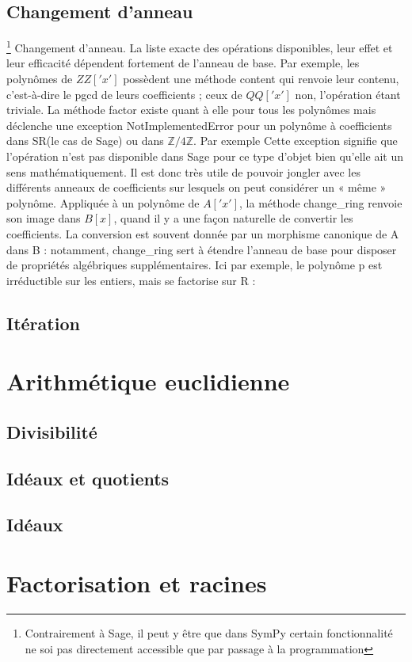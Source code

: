   \subsection{Changement d’anneau}\footnote{Contrairement à Sage, il peut y être que dans SymPy certain 
  fonctionnalité ne soi pas directement accessible que par passage à la programmation }
Changement d’anneau. La liste exacte des opérations disponibles, leur effet
et leur efficacité dépendent fortement de l’anneau de base. Par exemple, les
polynômes de $ZZ\left['x'\right]$ possèdent une méthode content qui renvoie leur contenu,
c’est-à-dire le pgcd de leurs coefficients ; ceux de $QQ\left['x'\right]$ non, l’opération étant
triviale. La méthode factor existe quant à elle pour tous les polynômes mais
déclenche une exception NotImplementedError pour un polynôme à coefficients
dans SR(le cas de Sage) ou dans $\mathbb{Z}/4\mathbb{Z}$. Par exemple Cette exception signifie que l’opération n’est pas disponible dans Sage pour ce type d’objet bien qu’elle ait un sens mathématiquement.
Il est donc très utile de pouvoir jongler avec les différents anneaux de coefficients
sur lesquels on peut considérer un « même » polynôme. Appliquée à un polynôme
de $A\left['x'\right]$, la méthode change\_ring renvoie son image dans $B\left[x\right]$, quand il y a une
façon naturelle de convertir les coefficients. La conversion est souvent donnée par
un morphisme canonique de A dans B : notamment, change\_ring sert à étendre
l’anneau de base pour disposer de propriétés algébriques supplémentaires. Ici par
exemple, le polynôme p est irréductible sur les entiers, mais se factorise sur R :
 \subsection{Itération}
 \section{Arithmétique euclidienne}
 \subsection{ Divisibilité}
 \subsection{ Idéaux et quotients}
 \subsection{Idéaux}
 \section{ Factorisation et racines}
